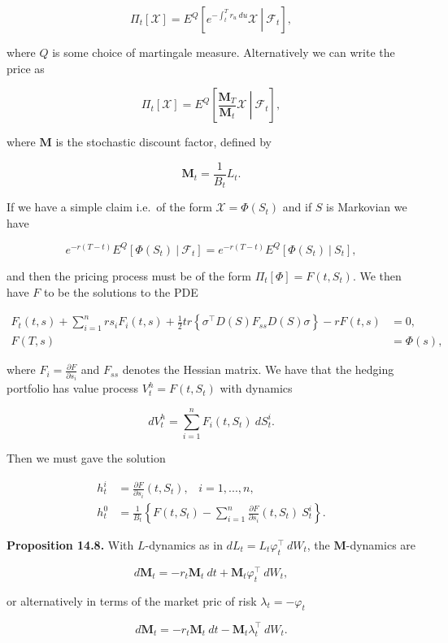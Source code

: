 \documentclass[
]{article}
\begin{document}
\[
\Pi_t[\mathcal{X}] = E^Q\left[\left. e^{-\int_t^Tr_u\ du}\mathcal{X} \ \right\vert\ \mathcal{F}_t\right],
\]

where \(Q\) is some choice of martingale measure. Alternatively we can
write the price as

\[
\Pi_t[\mathcal{X}] = E^Q\left[\left. \frac{\mathbf{M}_T}{\mathbf{M}_t}\mathcal{X} \ \right\vert\ \mathcal{F}_t\right],
\]

where \(\mathbf{M}\) is the stochastic discount factor, defined by

\[
\mathbf{M}_t=\frac{1}{B_t}L_t.
\]

If we have a simple claim i.e.~of the form \(\mathcal{X}=\Phi(S_t)\) and
if \(S\) is Markovian we have

\[
e^{-r(T-t)}E^Q[\Phi(S_t)\ \vert\ \mathcal{F}_t]=e^{-r(T-t)}E^Q[\Phi(S_t)\ \vert\ S_t],
\]

and then the pricing process must be of the form
\(\Pi_t[\Phi]=F(t,S_t)\). We then have \(F\) to be the solutions to the
PDE

\begin{align*}
F_t(t,s)+\sum_{i=1}^nrs_iF_i(t,s)+\frac{1}{2}tr\left\{\sigma^\top D(S)F_{ss}D(S)\sigma\right\}-rF(t,s)&=0,\\
F(T,s)&=\Phi(s),
\end{align*}

where \(F_i=\frac{\partial F}{\partial s_i}\) and \(F_{ss}\) denotes the
Hessian matrix. We have that the hedging portfolio has value process
\(V_t^h=F(t,S_t)\) with dynamics

\[
dV_t^h=\sum_{i=1}^n F_i(t,S_t)\ dS_t^i.
\]

Then we must gave the solution

\begin{align*}
h_t^i&=\frac{\partial F}{\partial s_i}(t,S_t),\hspace{10pt}i=1,...,n,\\
h_t^0&=\frac{1}{B_t}\left\{F(t,S_t)-\sum_{i=1}^n \frac{\partial F}{\partial s_i}(t,S_t)\ S_t^i\right\}.
\end{align*}

\textbf{Proposition 14.8.} With \(L\)-dynamics as in
\(dL_t=L_t\varphi^\top_t\ dW_t\), the \(\mathbf{M}\)-dynamics are

\[
d\mathbf{M}_t=-r_t\mathbf{M}_t\ dt+\mathbf{M}_t\varphi_t^\top\ dW_t,
\]

or alternatively in terms of the market pric of risk
\(\lambda_t=-\varphi_t\)

\[
d\mathbf{M}_t=-r_t\mathbf{M}_t\ dt-\mathbf{M}_t\lambda_t^\top\ dW_t.
\]
\end{document}
